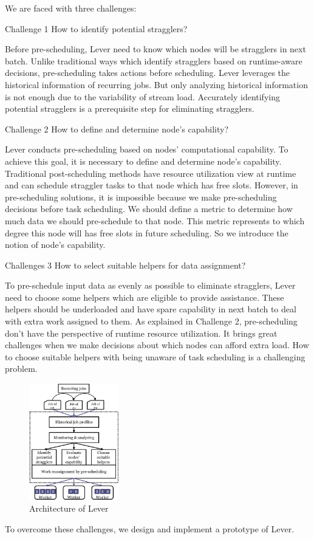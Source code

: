   We are faced with three challenges:

  Challenge 1 How to identify potential stragglers?

  Before pre-scheduling, Lever need to know which nodes will be stragglers in next batch. Unlike traditional ways which identify stragglers based on runtime-aware decisions, pre-scheduling takes actions before scheduling. Lever leverages the historical information of recurring jobs. But only analyzing historical information is not enough due to the variability of stream load. Accurately identifying potential stragglers is a prerequisite step for eliminating stragglers.

  Challenge 2 How to define and determine node's capability?

  Lever conducts pre-scheduling based on nodes' computational capability. To achieve this goal, it is necessary to define and determine node's capability. Traditional post-scheduling methods have resource utilization view at runtime and can schedule straggler tasks to that node which has free slots. However, in pre-scheduling solutions, it is impossible because we make pre-scheduling decisions before task scheduling. We should define a metric to determine how much data we should pre-schedule to that node. This metric represents to which degree this node will has free slots in future scheduling. So we introduce the notion of node's capability.

  Challenges 3 How to select suitable helpers for data assignment?

  To pre-schedule input data as evenly as possible to eliminate stragglers, Lever need to choose some helpers which are eligible to provide assistance. These helpers should be underloaded and have spare capability in next batch to deal with extra work assigned to them. As explained in Challenge 2, pre-scheduling don't have the perspective of runtime resource utilization. It brings great challenges when we make decisions about which nodes can afford extra load. How to choose suitable helpers with being unaware of task scheduling is a challenging problem.

  \begin{figure}[htbp]
    \centering
    \includegraphics[width=0.35\textwidth]{FigureArchitecture}
    \caption{Architecture of Lever}
    \label{Fig. 4:}
  \end{figure}
  To overcome these challenges, we design and implement a prototype of Lever.
